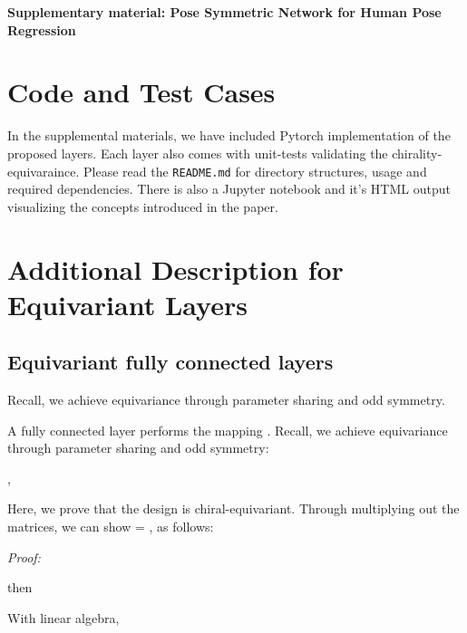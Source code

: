 \documentclass{article}
\begin{document}
{\small


}

\clearpage
\appendix
\renewcommand{\thetable}{A\arabic{table}}
\setcounter{table}{0}
\setcounter{figure}{0}
\renewcommand{\thetable}{A\arabic{table}}
\renewcommand\thefigure{A\arabic{figure}}
\renewcommand{\theHtable}{Appendix.\thetable}
\renewcommand{\theHfigure}{Appendix.\thefigure}

\newcommand*{\dictchar}[1]{
    \clearpage
    \twocolumn[
    \centerline{\parbox[c][3cm][c]{\textwidth}{
            \centering
            \fontsize{14}{14}
            \selectfont
            {#1}}}]
}

\onecolumn
{\centering \Large \textbf{Supplementary material: Pose Symmetric Network for Human Pose Regression}}

\section{Code and Test Cases}
In the supplemental materials, we have included Pytorch implementation of the proposed layers. Each layer also comes with unit-tests validating the chirality-equivaraince. Please read the \texttt{README.md} for directory structures, usage and required dependencies. There is also a Jupyter notebook and it's HTML output visualizing the concepts introduced in the paper. 

\section{Additional Description for Equivariant Layers}\label{extra_layers}

\subsection{Equivariant fully connected layers}
Recall, we achieve equivariance through parameter sharing and odd symmetry.

A fully connected layer performs the mapping . 
Recall, we achieve equivariance through parameter sharing and odd symmetry:

,


Here, we prove that the design is chiral-equivariant. Through multiplying out the matrices, we can show  = , as follows:

\textit{Proof:}


then  

With linear algebra,
\end{document}
